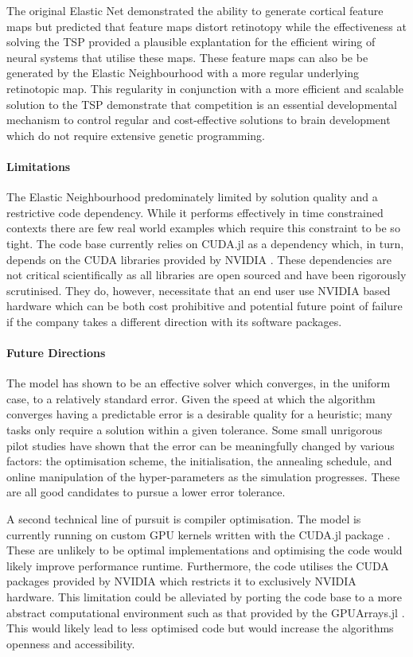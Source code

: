 The original Elastic Net demonstrated the ability to generate cortical feature maps but predicted that feature maps distort retinotopy while the effectiveness at solving the TSP provided a plausible explantation for the efficient wiring of neural systems that utilise these maps. These feature maps can also be be generated by the Elastic Neighbourhood with a more regular underlying retinotopic map. This regularity in conjunction with a more efficient and scalable solution to the TSP demonstrate that competition is an essential developmental mechanism to control regular and cost-effective solutions to brain development which do not require extensive genetic programming. 
\paragraph{Limitations}
The Elastic Neighbourhood predominately limited by solution quality and a restrictive code dependency. While it performs effectively in time constrained contexts there are few real world examples which require this constraint to be so tight. The code base currently relies on CUDA.jl as a dependency which, in turn, depends on the CUDA libraries provided by NVIDIA \cite{besard2018juliagpu, Nickolls2008-zz}. These dependencies are not critical scientifically as all libraries are open sourced and have been rigorously scrutinised. They do, however, necessitate that an end user use NVIDIA based hardware which can be both cost prohibitive and potential future point of failure if the company takes a different direction with its software packages.

\paragraph{Future Directions}
The model has shown to be an effective solver which converges, in the uniform case, to a relatively standard error. Given the speed at which the algorithm converges having a predictable error is a desirable quality for a heuristic; many tasks only require a solution within a given tolerance. Some small unrigorous pilot studies have shown that the error can be meaningfully changed by various factors: the optimisation scheme, the initialisation, the annealing schedule, and online manipulation of the hyper-parameters as the simulation progresses. These are all good candidates to pursue a lower error tolerance.

A second technical line of pursuit is compiler optimisation. The model is currently running on custom GPU kernels written with the CUDA.jl package \cite{ElasticNeighbourhood}. These are unlikely to be optimal implementations and optimising the code would likely improve performance runtime. Furthermore, the code utilises the CUDA packages provided by NVIDIA which restricts it to exclusively NVIDIA hardware. This limitation could be alleviated by porting the code base to a more abstract computational environment such as that provided by the GPUArrays.jl \cite{GPUArrays}. This would likely lead to less optimised code but would increase the algorithms openness and accessibility.
